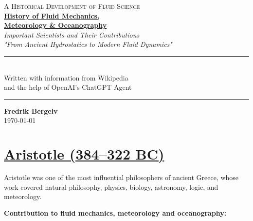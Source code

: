 \documentclass[12pt,a4paper]{article}
\begin{document}

\begin{titlepage}
    \thispagestyle{empty}

    \centering

    \vspace*{3cm}

    {\Large \textsc{A Historical Development of Fluid Science}}\\[1.2cm]

    {\Huge \underline{\textbf{History of Fluid Mechanics,}}}\\[0.35cm]
    {\Huge \underline{\textbf{Meteorology \& Oceanography}}}\\[1.2cm]

    {\Large \textit{\ztotpages\text{ }Important Scientists and Their Contributions}}\\
    {\large \textit{"From Ancient Hydrostatics to Modern Fluid Dynamics"}
    }\\[2.5cm]

    \rule{0.75\textwidth}{0.5pt}\\[1cm]

    {\large
    Written with information from Wikipedia \\ 
    and the help of OpenAI's ChatGPT Agent
    }\\[1cm]

    \rule{0.75\textwidth}{0.5pt}

    \vfill

    {\large
    \textbf{Fredrik Bergelv}\\[0.3cm]
    \today
    }

\end{titlepage}

\setcounter{page}{1}

\section*{\underline{\textbf{Aristotle (384--322 BC)}}}

{}Aristotle was one of the most influential philosophers of ancient Greece, whose work covered natural philosophy, physics, biology, astronomy, logic, and meteorology.

\textbf{Contribution to fluid mechanics, meteorology and oceanography:}
\end{document}
